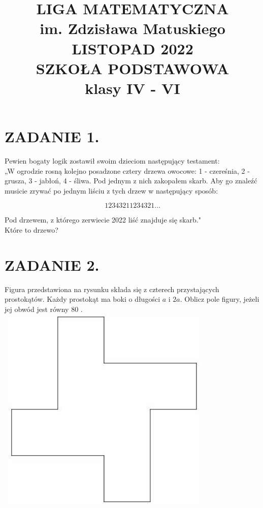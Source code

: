 \documentclass[10pt]{article}
\title{LIGA MATEMATYCZNA \\
 im. Zdzisława Matuskiego \\
 LISTOPAD 2022 \\
 SZKOŁA PODSTAWOWA \\
 klasy IV - VI }
\author{}
\date{}
\begin{document}
\maketitle
\section*{ZADANIE 1.}
Pewien bogaty logik zostawił swoim dzieciom następujący testament:\\
„W ogrodzie rosną kolejno posadzone cztery drzewa owocowe: 1 - czereśnia, 2 - grusza, 3 - jabłoń, 4 - śliwa. Pod jednym z nich zakopałem skarb. Aby go znaleźć musicie zrywać po jednym liściu z tych drzew w następujący sposób:

\[
12343211234321 \ldots
\]

Pod drzewem, z którego zerwiecie 2022 liść znajduje się skarb."\\
Które to drzewo?

\section*{ZADANIE 2.}
Figura przedstawiona na rysunku składa się z czterech przystających prostokątów. Każdy prostokąt ma boki o długości \(a\) i \(2 a\). Oblicz pole figury, jeżeli jej obwód jest równy 80 .\\
\includegraphics[max width=\textwidth, center]{2024_11_21_80308583ef159bc82e17g-1}
\end{document}
